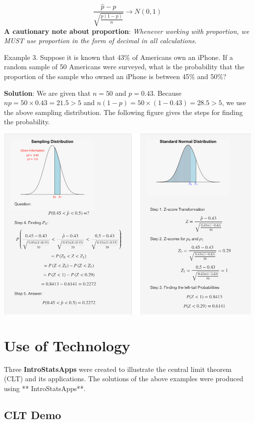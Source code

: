 \documentclass[
]{book}
\begin{document}
\[
\frac{\hat{p}-p}{\sqrt{\frac{p(1-p)}{n}}} \to N(0, 1)
\]
\textbf{A cautionary note about proportion}: \emph{Whenever working with proportion, we MUST use proportion in the form of decimal in all calculations.}

\hfill\break

Example 3. Suppose it is known that 43\% of Americans own an iPhone. If a random sample of 50 Americans were surveyed, what is the probability that the proportion of the sample who owned an iPhone is between 45\% and 50\%?

\textbf{Solution}: We are given that \(n = 50\) and \(p = 0.43\). Because \(np = 50\times 0.43 = 21.5 > 5\) and \(n(1-p) = 50 \times (1-0.43) = 28.5 > 5\), we use the above sampling distribution. The following figure gives the steps for finding the probability.

\begin{center}\includegraphics[width=1\linewidth]{week05/example03} \end{center}

\hfill\break

\hypertarget{use-of-technology-3}{%
\section{Use of Technology}\label{use-of-technology-3}}

Three \textbf{IntroStatsApps} were created to illustrate the central limit theorem (CLT) and its applications. The solutions of the above examples were produced using ** IntroStatsApps**.

\hypertarget{clt-demo}{%
\subsection{CLT Demo}\label{clt-demo}}
\end{document}
